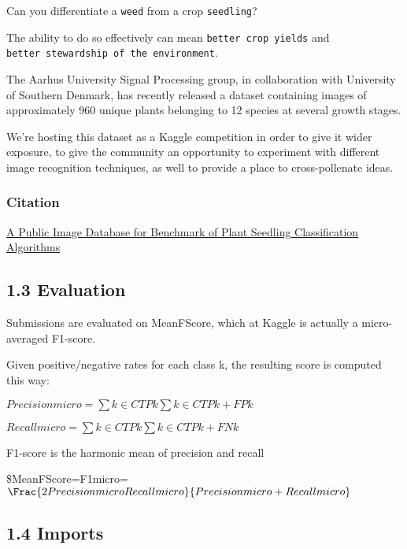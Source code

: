 \documentclass[11pt]{article}
\begin{document}
    Can you differentiate a \texttt{weed} from a crop \texttt{seedling}?

The ability to do so effectively can mean \texttt{better\ crop\ yields}
and \texttt{better\ stewardship\ of\ the\ environment}.

The Aarhus University Signal Processing group, in collaboration with
University of Southern Denmark, has recently released a dataset
containing images of approximately 960 unique plants belonging to 12
species at several growth stages.

We're hosting this dataset as a Kaggle competition in order to give it
wider exposure, to give the community an opportunity to experiment with
different image recognition techniques, as well to provide a place to
cross-pollenate ideas.

    \hypertarget{citation}{%
\subsubsection{Citation}\label{citation}}

\href{https://arxiv.org/abs/1711.05458v1}{A Public Image Database for
Benchmark of Plant Seedling Classification Algorithms}

    \hypertarget{evaluation}{%
\subsection{1.3 Evaluation}\label{evaluation}}

    Submissions are evaluated on MeanFScore, which at Kaggle is actually a
micro-averaged F1-score.

Given positive/negative rates for each class k, the resulting score is
computed this way:

\(Precisionmicro=∑k∈CTPk∑k∈CTPk+FPk\)

\(Recallmicro=∑k∈CTPk∑k∈CTPk+FNk\)

F1-score is the harmonic mean of precision and recall

\$MeanFScore=F1micro=
\(\Frac{2PrecisionmicroRecallmicro}{Precisionmicro+Recallmicro}\)

    \hypertarget{imports}{%
\subsection{1.4 Imports}\label{imports}}
\end{document}
